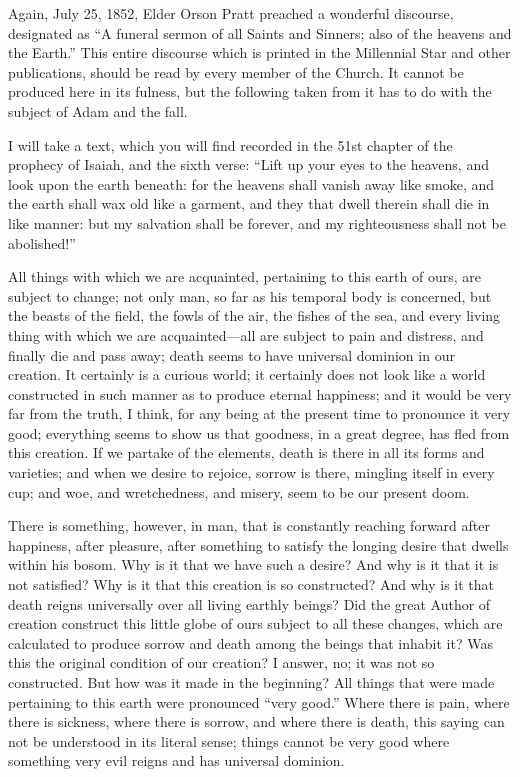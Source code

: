 Again, July 25, 1852, Elder Orson Pratt preached a wonderful discourse, designated as ``A
funeral sermon of all Saints and Sinners; also of the heavens and the Earth.'' This entire
discourse which is printed in the Millennial Star and other publications, should be read by
every member of the Church. It cannot be produced here in its fulness, but the following
taken from it has to do with the subject of Adam and the fall.

I will take a text, which you will find recorded in the 51st chapter of the prophecy of Isaiah,
and the sixth verse: ``Lift up your eyes to the heavens, and look upon the earth beneath: for
the heavens shall vanish away like smoke, and the earth shall wax old like a garment, and
they that dwell therein shall die in like manner: but my salvation shall be forever, and my
righteousness shall not be abolished!''

All things with which we are acquainted, pertaining to this earth of ours, are subject to
change; not only man, so far as his temporal body is concerned, but the beasts of the field,
the fowls of the air, the fishes of the sea, and every living thing with which we are
acquainted—all are subject to pain and distress, and finally die and pass away; death seems
to have universal dominion in our creation. It certainly is a curious world; it certainly does
not look like a world constructed in such manner as to produce eternal happiness; and it
would be very far from the truth, I think, for any being at the present time to pronounce it
very good; everything seems to show us that goodness, in a great degree, has fled from this
creation. If we partake of the elements, death is there in all its forms and varieties; and when
we desire to rejoice, sorrow is there, mingling itself in every cup; and woe, and
wretchedness, and misery, seem to be our present doom.

There is something, however, in man, that is constantly reaching forward after happiness,
after pleasure, after something to satisfy the longing desire that dwells within his bosom.
Why is it that we have such a desire? And why is it that it is not satisfied? Why is it that this
creation is so constructed? And why is it that death reigns universally over all living earthly
beings? Did the great Author of creation construct this little globe of ours subject to all these
changes, which are calculated to produce sorrow and death among the beings that inhabit it?
Was this the original condition of our creation? I answer, no; it was not so constructed. But
how was it made in the beginning? All things that were made pertaining to this earth were
pronounced ``very good.'' Where there is pain, where there is sickness, where there is sorrow,
and where there is death, this saying can not be understood in its literal sense; things cannot
be very good where something very evil reigns and has universal dominion.

